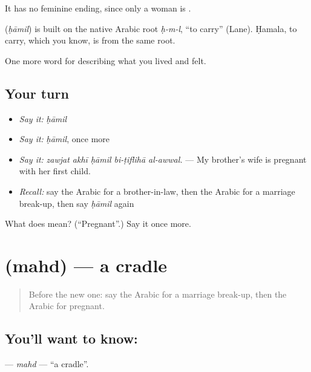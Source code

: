It has no feminine ending, since only a woman is .

\begin{cousinweb}
\textbf{} (\emph{ḥāmil}) is built on the native Arabic root \emph{ḥ-m-l}, \textquotedblleft{}to carry\textquotedblright{} (Lane). Ḥamala, to carry, which you know, is from the same root.
\end{cousinweb}

\begin{grammarlens}[title={What you've built}]
One more word for describing what you lived and felt.
\end{grammarlens}

\subsection*{Your turn}
\begin{itemize}
\raggedright
  \item \emph{Say it:} \emph{ḥāmil}
  \item \emph{Say it:} \emph{ḥāmil}, once more
  \item \emph{Say it:} \emph{zawjat akhī ḥāmil bi-ṭiflihā al-awwal.} — My brother's wife is pregnant with her first child.
  \item \emph{Recall:} say the Arabic for a brother-in-law, then the Arabic for a marriage break-up, then say \emph{ḥāmil} again
\end{itemize}

\begin{tcolorbox}[breakable,colback=teal!4,colframe=teal!35!black,title={Before you move on}]
What does  mean? (\textquotedblleft{}Pregnant\textquotedblright{}.) Say it once more.
\end{tcolorbox}
\section[\texorpdfstring{\ar{مهد} (mahd)}{مهد (mahd)}]{ (mahd) — a cradle}

\label{lesson:AR-C530-mahd}



\begin{quote}
Before the new one: say the Arabic for a marriage break-up, then the Arabic for pregnant.
\end{quote}

\subsection*{You'll want to know: }
\textbf{} — \emph{mahd} — \textquotedblleft{}a cradle\textquotedblright{}.

